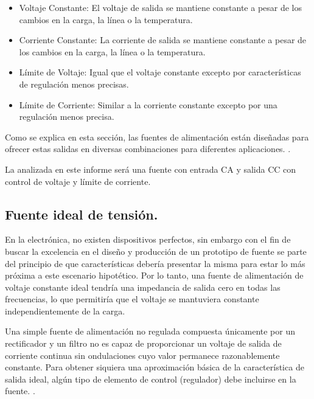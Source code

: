 \begin{itemize}
    \item Voltaje Constante: El voltaje de salida se mantiene constante a pesar de los cambios en la carga, la línea o la temperatura.
    \item Corriente Constante: La corriente de salida se mantiene constante a pesar de los cambios en la carga, la línea o la temperatura.
    \item Límite de Voltaje: Igual que el voltaje constante excepto por características de regulación menos precisas.
    \item Límite de Corriente: Similar a la corriente constante excepto por una regulación menos precisa.
\end{itemize} \par 
Como se explica en esta sección, las fuentes de alimentación están diseñadas para ofrecer estas salidas en diversas combinaciones para diferentes aplicaciones. \cite{agilent2000}. \par 
La analizada en este informe será una fuente con entrada CA y salida CC con control de voltaje y límite de corriente.

\subsection{Fuente ideal de  tensión.} \par 
En la electrónica, no existen dispositivos perfectos, sin embargo con el fin de buscar la excelencia en el diseño y producción de un prototipo de fuente se parte del principio de que características debería presentar la misma para estar lo más próxima a este escenario hipotético. Por lo tanto, una fuente de alimentación de voltaje constante ideal tendría una impedancia de salida cero en todas las frecuencias, lo que permitiría que el voltaje se mantuviera constante independientemente de la carga. \par 

Una simple fuente de alimentación no regulada compuesta únicamente por un rectificador y un filtro no es capaz de proporcionar un voltaje de salida de corriente continua sin ondulaciones cuyo valor permanece razonablemente constante. Para obtener siquiera una aproximación básica de la característica de salida ideal, algún tipo de elemento de control (regulador) debe incluirse en la fuente. \cite{agilent2000}. 


